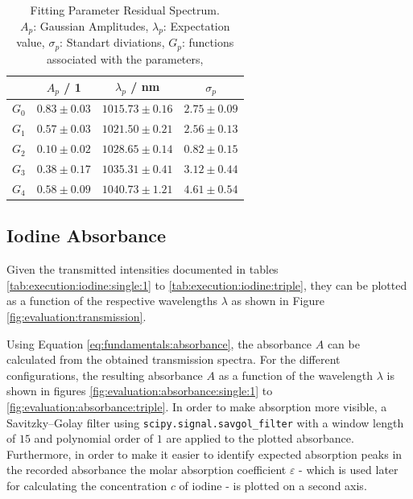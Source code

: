 \begin{table}[H]
        \label{}
        \centering
        \caption{Fitting Parameter Residual Spectrum. \\
        $A_p$: Gaussian Amplitudes,
        $\lambda_p$: Expectation value,
        $\sigma_p$: Standart diviations,
        $G_p$: functions associated with the parameters,}
        \begin{tabular}{c|ccc} \hline
            &  $A_p$ / 1 &  $\lambda_p$ / nm & $\sigma_p$ \\ \hline  \hline 
        $G_0$&$0.83 \pm 0.03$&$1015.73 \pm 0.16$&$2.75 \pm 0.09$\\ \hline
        $G_1$&$0.57 \pm 0.03$&$1021.50 \pm 0.21$&$2.56 \pm 0.13$\\ \hline
        $G_2$&$0.10 \pm 0.02$&$1028.65 \pm 0.14$&$0.82 \pm 0.15$\\ \hline
        $G_3$&$0.38 \pm 0.17$&$1035.31 \pm 0.41$&$3.12 \pm 0.44$\\ \hline
        $G_4$&$0.58 \pm 0.09$&$1040.73 \pm 1.21$&$4.61 \pm 0.54$\\ \hline
        \end{tabular}
\end{table}   
    
\subsection{Iodine Absorbance}
\label{sec:evaluation:iodine-absorbance}

Given the transmitted intensities documented in tables \ref{tab:execution:iodine:single:1} to \ref{tab:execution:iodine:triple}, they can be plotted as a function of the respective wavelengths $\lambda$ as shown in Figure \ref{fig:evaluation:transmission}.

Using Equation \ref{eq:fundamentals:absorbance}, the absorbance $A$ can be calculated from the obtained transmission spectra. For the different configurations, the resulting absorbance $A$ as a function of the wavelength $\lambda$ is shown in figures \ref{fig:evaluation:absorbance:single:1} to \ref{fig:evaluation:absorbance:triple}. In order to make absorption more visible, a Savitzky–Golay filter using \verb|scipy.signal.savgol_filter| with a window length of $15$ and polynomial order of $1$ are applied to the plotted absorbance. Furthermore, in order to make it easier to identify expected absorption peaks in the recorded absorbance the molar absorption coefficient $\varepsilon$ - which is used later for calculating the concentration $c$ of iodine - is plotted on a second axis.

